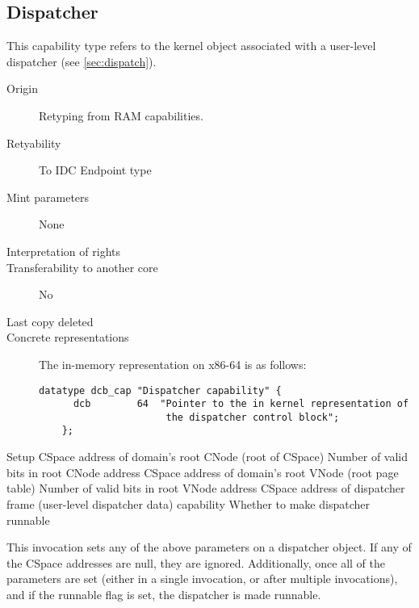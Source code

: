 \subsection{Dispatcher}
This capability type refers to the kernel object associated with a
user-level dispatcher (see \ref{sec:dispatch}).

\begin{description}
\item[Origin] Retyping from RAM capabilities.
  
\item[Retyability] To IDC Endpoint type
  
\item[Mint parameters] None
  
\item[Interpretation of rights] 
  
\item[Transferability to another core] No

\item[Last copy deleted] 
  
\item[Concrete representations] The in-memory representation on x86-64
  is as follows:
  
  \begin{lstlisting}[language=Mackerel]
    datatype dcb_cap "Dispatcher capability" {
      dcb        64  "Pointer to the in kernel representation of
                      the dispatcher control block";
    };
  \end{lstlisting}
\end{description}

\begin{invocation}{Setup}
  \arg CSpace address of domain's root CNode (root of CSpace)
  \arg Number of valid bits in root CNode address
  \arg CSpace address of domain's root VNode (root page table)
  \arg Number of valid bits in root VNode address
  \arg CSpace address of dispatcher frame (user-level dispatcher
  data) capability
  \arg Whether to make dispatcher runnable
\end{invocation}
This invocation sets any of the above parameters on a dispatcher
object.  If any of the CSpace addresses are null, they are ignored.
Additionally, once all of the parameters are set (either in a single
invocation, or after multiple invocations), and if the runnable flag
is set, the dispatcher is made runnable.  

